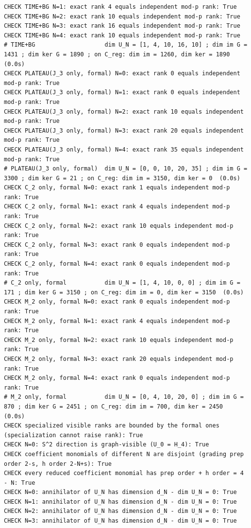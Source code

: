 \documentclass{article}
\theoremstyle{remark}
\begin{document}
\begin{lstlisting}
CHECK TIME+BG N=1: exact rank 4 equals independent mod-p rank: True
CHECK TIME+BG N=2: exact rank 10 equals independent mod-p rank: True
CHECK TIME+BG N=3: exact rank 16 equals independent mod-p rank: True
CHECK TIME+BG N=4: exact rank 10 equals independent mod-p rank: True
# TIME+BG                    dim U_N = [1, 4, 10, 16, 10] ; dim im G = 1431 ; dim ker G = 1890 ; on C_reg: dim im = 1260, dim ker = 1890  (0.0s)
CHECK PLATEAU(J_3 only, formal) N=0: exact rank 0 equals independent mod-p rank: True
CHECK PLATEAU(J_3 only, formal) N=1: exact rank 0 equals independent mod-p rank: True
CHECK PLATEAU(J_3 only, formal) N=2: exact rank 10 equals independent mod-p rank: True
CHECK PLATEAU(J_3 only, formal) N=3: exact rank 20 equals independent mod-p rank: True
CHECK PLATEAU(J_3 only, formal) N=4: exact rank 35 equals independent mod-p rank: True
# PLATEAU(J_3 only, formal)  dim U_N = [0, 0, 10, 20, 35] ; dim im G = 3300 ; dim ker G = 21 ; on C_reg: dim im = 3150, dim ker = 0  (0.0s)
CHECK C_2 only, formal N=0: exact rank 1 equals independent mod-p rank: True
CHECK C_2 only, formal N=1: exact rank 4 equals independent mod-p rank: True
CHECK C_2 only, formal N=2: exact rank 10 equals independent mod-p rank: True
CHECK C_2 only, formal N=3: exact rank 0 equals independent mod-p rank: True
CHECK C_2 only, formal N=4: exact rank 0 equals independent mod-p rank: True
# C_2 only, formal           dim U_N = [1, 4, 10, 0, 0] ; dim im G = 171 ; dim ker G = 3150 ; on C_reg: dim im = 0, dim ker = 3150  (0.0s)
CHECK M_2 only, formal N=0: exact rank 0 equals independent mod-p rank: True
CHECK M_2 only, formal N=1: exact rank 4 equals independent mod-p rank: True
CHECK M_2 only, formal N=2: exact rank 10 equals independent mod-p rank: True
CHECK M_2 only, formal N=3: exact rank 20 equals independent mod-p rank: True
CHECK M_2 only, formal N=4: exact rank 0 equals independent mod-p rank: True
# M_2 only, formal           dim U_N = [0, 4, 10, 20, 0] ; dim im G = 870 ; dim ker G = 2451 ; on C_reg: dim im = 700, dim ker = 2450  (0.0s)
CHECK specialized visible ranks are bounded by the formal ones (specialization cannot raise rank): True
CHECK N=0: S^2 direction is graph-visible (U_0 = H_4): True
CHECK coefficient monomials of different N are disjoint (grading prep order 2-s, h order 2-N+s): True
CHECK every reduced coefficient monomial has prep order + h order = 4 - N: True
CHECK N=0: annihilator of U_N has dimension d_N - dim U_N = 0: True
CHECK N=1: annihilator of U_N has dimension d_N - dim U_N = 0: True
CHECK N=2: annihilator of U_N has dimension d_N - dim U_N = 0: True
CHECK N=3: annihilator of U_N has dimension d_N - dim U_N = 0: True

\end{lstlisting}
\end{document}
